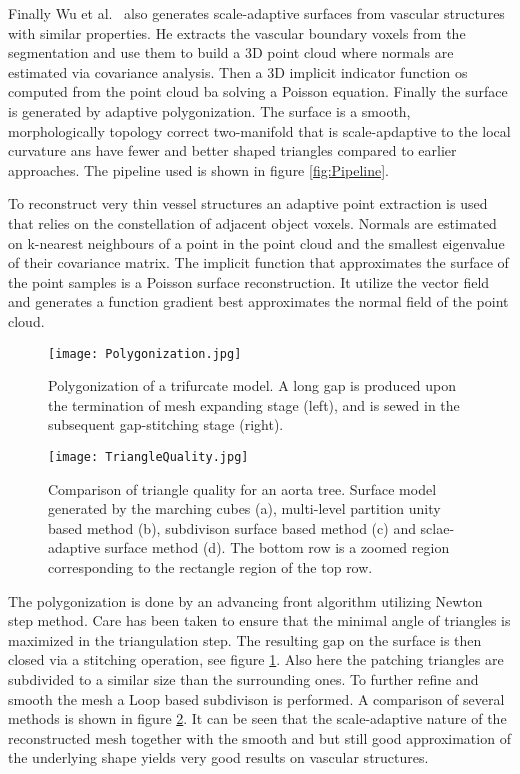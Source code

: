 Finally Wu et al.~\cite{wu2010scale} also generates scale-adaptive surfaces from vascular structures with similar properties. He extracts the vascular boundary voxels from the segmentation and use them to build a 3D point cloud where normals are estimated via covariance analysis. Then a 3D implicit indicator function os computed from the point cloud ba solving a Poisson equation. Finally the surface is generated by adaptive polygonization.
The surface is a smooth, morphologically topology correct two-manifold that is scale-apdaptive to the local curvature ans have fewer and better shaped triangles compared to earlier approaches. The pipeline used is shown in figure \ref{fig:Pipeline}. 

To reconstruct very thin vessel structures an adaptive point extraction is used that relies on the constellation of adjacent object voxels. Normals are estimated on k-nearest neighbours of a point in the point cloud and the smallest eigenvalue of their covariance matrix. The implicit function that approximates the surface of the point samples is a Poisson surface reconstruction. It utilize the vector field and generates a function gradient best approximates the normal field of the point cloud.

\begin{figure}[h]
	\centering
	\texttt{[image: Polygonization.jpg]} \\
	\caption{Polygonization of a trifurcate model. A long gap is produced upon the termination of mesh
		expanding stage (left), and is sewed in the subsequent gap-stitching stage (right).}
	\cite{wu2010scale}
	\label{fig:Polygonization}
\end{figure} 

\begin{figure}[h]
	\centering
	\texttt{[image: TriangleQuality.jpg]} \\
	\caption{ Comparison of triangle quality for an aorta tree. Surface model generated by the marching cubes (a),
		multi-level partition unity based method (b), subdivison surface based method (c) and sclae-adaptive surface method (d). The bottom row is a zoomed region corresponding to the rectangle region of the top row.}
	\cite{wu2010scale}
	\label{fig:TriangleQuality}
\end{figure} 

The polygonization is done by an advancing front algorithm utilizing Newton step method. Care has been taken to ensure that the minimal angle of triangles is maximized in the triangulation step. The resulting gap on the surface is then closed via a stitching operation, see figure \ref{fig:Polygonization}. Also here the patching triangles are subdivided to a similar size than the surrounding ones. To further refine and smooth the mesh a Loop based subdivison is performed.
A comparison of several methods is shown in figure \ref{fig:TriangleQuality}. It can be seen that the scale-adaptive nature of the reconstructed mesh together with the smooth and but still good approximation of the underlying shape yields very good results on vascular structures. 
